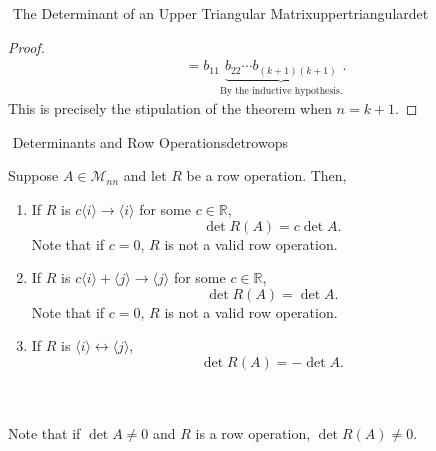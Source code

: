 \begin{theorem}{\Stop\,\,The Determinant of an Upper Triangular Matrix}{uppertriangulardet}
\begin{proof}
\begin{align*}
                    &= b_{11}\underbrace{b_{22}\cdots b_{(k+1)(k+1)}}_{\text{By the inductive hypothesis.}}.
                \end{align*}
                This is precisely the stipulation of the theorem when \(n=k+1\).
            \end{proof}

        \end{theorem}
        \pagebreak
        \begin{theorem}{\Stop\,\,Determinants and Row Operations}{detrowops}

            Suppose \(A\in\mathcal{M}_{nn}\) and let \(R\) be a row operation. Then,
            \begin{enumerate}
                \item If \(R\) is \(c\langle i\rangle\to\langle i \rangle\) for some \(c\in\mathbb{R}\), 
                \begin{equation*}
                    \det R(A) = c\det A.
                \end{equation*}
                Note that if \(c=0\), \(R\) is not a valid row operation.
                \item If \(R\) is \(c\langle i\rangle+\langle j \rangle\to\langle j \rangle\) for some \(c\in\mathbb{R}\),
                \begin{equation*}
                    \det R(A) = \det A.
                \end{equation*}
                Note that if \(c=0\), \(R\) is not a valid row operation.
                \item If \(R\) is \(\langle i \rangle\leftrightarrow\langle j \rangle\),
                \begin{equation*}
                    \det R(A) = -\det A.
                \end{equation*}
            \end{enumerate}
            \vphantom
            \\
            \\
            Note that if \(\det A\neq 0\) and \(R\) is a row operation, \(\det R(A)\neq 0\).
        \end{theorem}
        \vphantom
        \\

